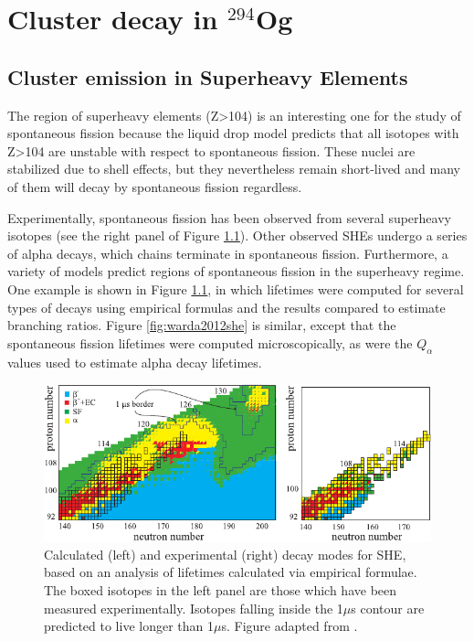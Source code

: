 \chapter{Cluster decay in $^{294}$Og}\label{chap:294Og}

\section{Cluster emission in Superheavy Elements}

The region of superheavy elements (Z>104) is an interesting one for the study of spontaneous fission because the liquid drop model predicts that all isotopes with Z>104 are unstable with respect to spontaneous fission. These nuclei are stabilized due to shell effects, but they nevertheless remain short-lived and many of them will decay by spontaneous fission regardless.

Experimentally, spontaneous fission has been observed from several superheavy isotopes (see the right panel of Figure \ref{fig:karpovshedecay}). Other observed SHEs undergo a series of alpha decays, which chains terminate in spontaneous fission. Furthermore, a variety of models predict regions of spontaneous fission in the superheavy regime. One example is shown in Figure \ref{fig:karpovshedecay}, in which lifetimes were computed for several types of decays using empirical formulas and the results compared to estimate branching ratios. Figure \ref{fig:warda2012she} is similar, except that the spontaneous fission lifetimes were computed microscopically, as were the $Q_\alpha$ values used to estimate alpha decay lifetimes.


\begin{figure}
	\centering
	\includegraphics[width=0.9\linewidth]{TeX_files/294Og_Karpov_SHEdecay}
	\caption[Calculated and experimental decay modes for SHE]{Calculated (left) and experimental (right) decay modes for SHE, based on an analysis of lifetimes calculated via empirical formulae. The boxed isotopes in the left panel are those which have been measured experimentally. Isotopes falling inside the 1$\mu$s contour are predicted to live longer than 1$\mu$s. Figure adapted from \cite{Karpova}.}
	\label{fig:karpovshedecay}
\end{figure}


